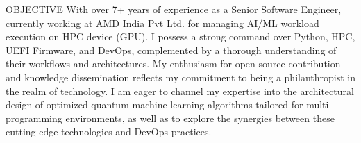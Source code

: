 \documentclass{resume} %
\begin{document}
\def\profile{0}


\begin{rSection}{OBJECTIVE}
{With over 7+ years of experience as a Senior Software Engineer, currently working at AMD India Pvt Ltd. for managing AI/ML workload execution on HPC device (GPU). I possess a strong command over Python, HPC, UEFI Firmware, and DevOps, complemented by a thorough understanding of their workflows and architectures. My enthusiasm for open-source contribution and knowledge dissemination reflects my commitment to being a philanthropist in the realm of technology. I am eager to channel my expertise into the architectural design of optimized quantum machine learning algorithms tailored for multi-programming environments, as well as to explore the synergies between these cutting-edge technologies and DevOps practices.}

\end{rSection}




\end{document}
